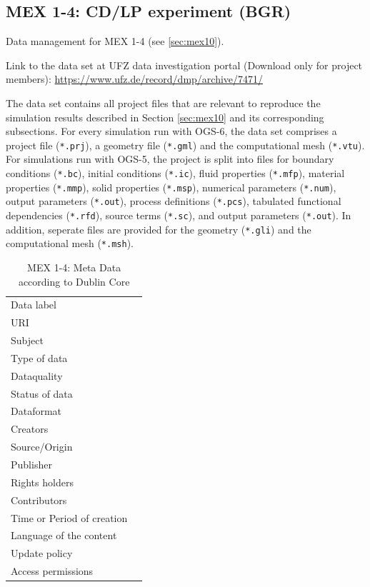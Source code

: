 \subsection{MEX 1-4: CD/LP experiment (BGR)}

Data management for MEX 1-4 (see \ref{sec:mex10}).

Link to the data set at UFZ data investigation portal (Download only for project members):
\hyperlink{https://www.ufz.de/record/dmp/archive/7471/}{https://www.ufz.de/record/dmp/archive/7471/}

The data set contains all project files that are relevant to reproduce the simulation results described in Section \ref{sec:mex10} and its corresponding subsections. For every simulation run with OGS-6, the data set comprises a project file (\texttt{*.prj}), a geometry file (\texttt{*.gml}) and the computational mesh (\texttt{*.vtu}). For simulations run with OGS-5, the project is split into files for boundary conditions (\texttt{*.bc}), initial conditions (\texttt{*.ic}), fluid properties (\texttt{*.mfp}), material properties (\texttt{*.mmp}), solid properties (\texttt{*.msp}), numerical parameters (\texttt{*.num}), output parameters (\texttt{*.out}), process definitions (\texttt{*.pcs}), tabulated functional dependencies (\texttt{*.rfd}), source terms (\texttt{*.sc}), and output parameters (\texttt{*.out}). In addition, seperate files are provided for the geometry (\texttt{*.gli}) and the computational mesh (\texttt{*.msh}).

\begin{table}[h!]
\caption{MEX 1-4: Meta Data according to Dublin Core}
\label{tab:}
\small
\begin{tabular}{R{3cm}|L{7cm}}
\hline
%
Data label &  \\
URI &  \\
Subject  &  \\
Type of data  &  \\
Dataquality  &  \\
Status of data  &  \\
Dataformat  & \\
Creators  &  \\
Source/Origin &  \\
Publisher  &  \\
Rights holders &  \\
Contributors &  \\
Time or Period of creation &  \\
Language of the content &  \\
Update policy &  \\
Access permissions &  \\
%
\hline
\end{tabular}
\end{table}

